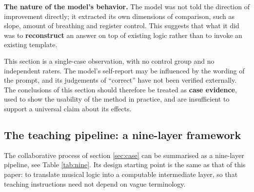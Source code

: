 \documentclass[11pt,a4paper]{article}
\begin{document}
\begin{observation}
\textbf{The nature of the model's behavior.} The model was not told the direction of
improvement directly; it extracted its own dimensions of comparison, such as slope,
amount of breathing and register control. This suggests that what it did was to
\textbf{reconstruct} an answer on top of existing logic rather than to invoke an
existing template.
\end{observation}

\begin{remark}
This section is a single-case observation, with no control group and no independent
raters. The model's self-report may be influenced by the wording of the prompt, and its
judgements of ``correct'' have not been verified externally. The conclusions of this
section should therefore be treated as \textbf{case evidence}, used to show the
usability of the method in practice, and are insufficient to support a universal claim
about its effects.
\end{remark}

\subsection{The teaching pipeline: a nine-layer framework}
The collaborative process of section \ref{sec:case} can be summarised as a nine-layer
pipeline, see Table \ref{tab:nine}. Its design starting point is the same as that of
this paper: to translate musical logic into a computable intermediate layer, so that
teaching instructions need not depend on vague terminology.
\end{document}
